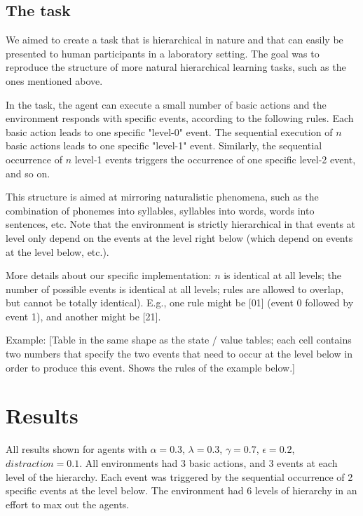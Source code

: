 \documentclass{article}
\begin{document}
\subsection{The task}

We aimed to create a task that is hierarchical in nature and that can easily be presented to human participants in a laboratory setting. The goal was to reproduce the structure of more natural hierarchical learning tasks, such as the ones mentioned above. 

In the task, the agent can execute a small number of basic actions and the environment responds with specific events, according to the following rules. Each basic action leads to one specific "level-0" event. The sequential execution of $n$ basic actions leads to one specific "level-1" event. Similarly, the sequential occurrence of $n$ level-1 events triggers the occurrence of one specific level-2 event, and so on. 

This structure is aimed at mirroring naturalistic phenomena, such as the combination of phonemes into syllables, syllables into words, words into sentences, etc. Note that the environment is strictly hierarchical in that events at level only depend on the events at the level right below (which depend on events at the level below, etc.).

More details about our specific implementation: $n$ is identical at all levels; the number of possible events is identical at all levels; rules are allowed to overlap, but cannot be totally identical). E.g., one rule might be [01] (event 0 followed by event 1), and another might be [21].

Example: [Table in the same shape as the state / value tables; each cell contains two numbers that specify the two events that need to occur at the level below in order to produce this event. Shows the rules of the example below.]

\section{Results}

All results shown for agents with $\alpha = 0.3$, $\lambda = 0.3$, $\gamma = 0.7$, $\epsilon = 0.2$, $distraction = 0.1$. All environments had 3 basic actions, and 3 events at each level of the hierarchy. Each event was triggered by the sequential occurrence of 2 specific events at the level below. The environment had 6 levels of hierarchy in an effort to max out the agents. 
\end{document}
